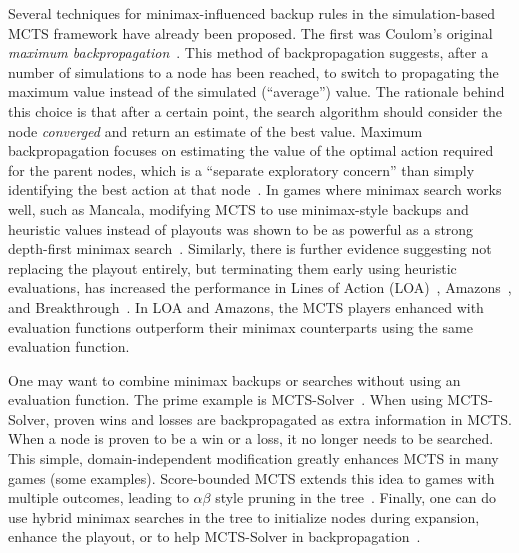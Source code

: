 \documentclass[letterpaper]{article}
\begin{document}
Several techniques for minimax-influenced backup rules in the simulation-based MCTS framework have already been proposed. 
The first was Coulom's original {\it maximum backpropagation}~\cite{Coulom06Efficient}. This method of backpropagation
suggests, after a number of simulations to a node has been reached, to switch to propagating the maximum value instead 
of the simulated (``average'') value. 
The rationale behind this choice is that after a certain point, the search algorithm should consider the node
{\it converged} and return an estimate of the best value. 
Maximum backpropagation focuses on estimating the value of the optimal action required for the parent nodes, which is a
``separate exploratory concern'' than simply identifying the best action at that node~\cite{Feldman13Theoretically}.
In games where minimax search works well, such as Mancala, modifying MCTS to 
use minimax-style backups and heuristic values instead of playouts was shown to be as powerful as a strong 
depth-first minimax search~\cite{Ramanujan11Tradeoffs}.
Similarly, there is further evidence suggesting not replacing the playout entirely, but terminating them early 
using heuristic evaluations, has increased the performance in Lines of Action (LOA)~\cite{Winands10MCTS-LOA}, 
Amazons~\cite{Kloetzer10Amazons,Lorentz08Amazons}, and Breakthrough~\cite{Lorentz13Breakthrough}. In LOA and Amazons, the 
MCTS players enhanced with evaluation functions outperform their minimax counterparts using the same evaluation function.


One may want to combine minimax backups or searches without using an evaluation function. 
The prime example is MCTS-Solver~\cite{Winands08Solver}. When using 
MCTS-Solver, proven wins and losses are backpropagated as extra information in MCTS. When a node is proven to be a 
win or a loss, it no longer needs to be searched. This simple, domain-independent modification greatly enhances 
MCTS in many games (some examples). Score-bounded MCTS extends this idea to games with multiple outcomes, 
leading to $\alpha \beta$ style pruning in the tree~\cite{Cazenave10ScoreBounded}. Finally, one can do use hybrid
minimax searches in the tree to initialize nodes during expansion, enhance the playout, or to help MCTS-Solver 
in backpropagation~\cite{Baier13MinimaxHybrids}.
\end{document}
